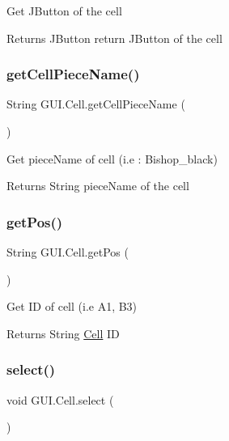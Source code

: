 Get J\+Button of the cell

\begin{DoxyReturn}{Returns}
J\+Button return J\+Button of the cell 
\end{DoxyReturn}
\mbox{\label{class_g_u_i_1_1_cell_a156e05655896ab49489216b8303b6656}} 
\subsubsection{\texorpdfstring{getCellPieceName()}{getCellPieceName()}}
{\footnotesize\ttfamily String G\+U\+I.\+Cell.\+get\+Cell\+Piece\+Name (\begin{DoxyParamCaption}{ }\end{DoxyParamCaption})\hspace{0.3cm}{\ttfamily [inline]}}

Get piece\+Name of cell (i.\+e \+: Bishop\+\_\+black)

\begin{DoxyReturn}{Returns}
String piece\+Name of the cell 
\end{DoxyReturn}
\mbox{\label{class_g_u_i_1_1_cell_aaa3748ffb6d456946ce2d582dc58ee77}} 
\subsubsection{\texorpdfstring{getPos()}{getPos()}}
{\footnotesize\ttfamily String G\+U\+I.\+Cell.\+get\+Pos (\begin{DoxyParamCaption}{ }\end{DoxyParamCaption})\hspace{0.3cm}{\ttfamily [inline]}}

Get ID of cell (i.\+e A1, B3)

\begin{DoxyReturn}{Returns}
String \mbox{\hyperlink{class_g_u_i_1_1_cell}{Cell}} ID 
\end{DoxyReturn}
\mbox{\label{class_g_u_i_1_1_cell_a41b84e7aa586eda9927223fd0d84af5f}} 
\subsubsection{\texorpdfstring{select()}{select()}}
{\footnotesize\ttfamily void G\+U\+I.\+Cell.\+select (\begin{DoxyParamCaption}{ }\end{DoxyParamCaption})\hspace{0.3cm}{\ttfamily [inline]}}

